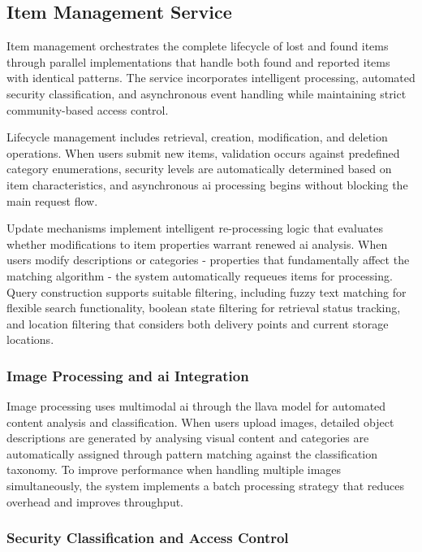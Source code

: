 \subsection{Item Management Service} \label{subsection:item_management_service}

Item management orchestrates the complete lifecycle of lost and found items through parallel implementations that handle both found and reported items with identical patterns. The service incorporates intelligent processing, automated security classification, and asynchronous event handling while maintaining strict community-based access control.

Lifecycle management includes retrieval, creation, modification, and deletion operations. When users submit new items, validation occurs against predefined category enumerations, security levels are automatically determined based on item characteristics, and asynchronous \ac{ai} processing begins without blocking the main request flow.

Update mechanisms implement intelligent re-processing logic that evaluates whether modifications to item properties warrant renewed \ac{ai} analysis. When users modify descriptions or categories - properties that fundamentally affect the matching algorithm - the system automatically requeues items for processing. Query construction supports suitable filtering, including fuzzy text matching for flexible search functionality, boolean state filtering for retrieval status tracking, and location filtering that considers both delivery points and current storage locations.

\subsubsection{Image Processing and \acs{ai} Integration}

Image processing uses multimodal \ac{ai} through the \ac{llava} model for automated content analysis and classification. When users upload images, detailed object descriptions are generated by analysing visual content and categories are automatically assigned through pattern matching against the classification taxonomy. To improve performance when handling multiple images simultaneously, the system implements a batch processing strategy that reduces overhead and improves throughput.

\subsubsection{Security Classification and Access Control}

